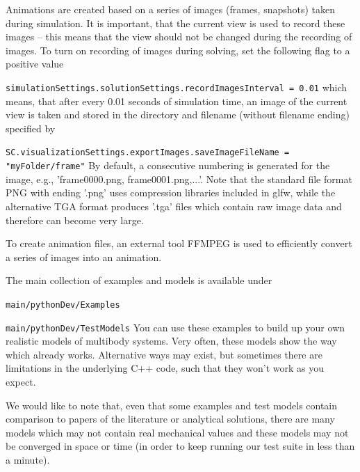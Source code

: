 Animations are created based on a series of images (frames, snapshots) taken during simulation. It is important, that the current view is used to record these images -- this means that the view should not be changed during the recording of images.
To turn on recording of images during solving, set the following flag to a positive value
\bi
  \item \texttt{simulationSettings.solutionSettings.recordImagesInterval = 0.01}
\ei
which means, that after every 0.01 seconds of simulation time, an image of the current view is taken and stored in the directory and filename (without filename ending) specified by 
\bi
  \item \texttt{SC.visualizationSettings.exportImages.saveImageFileName = "myFolder/frame"}
\ei
By default, a consecutive numbering is generated for the image, e.g., 'frame0000.png, frame0001.png,...'. Note that the standard file format PNG with ending '.png' uses compression libraries included in glfw, while the alternative TGA format produces '.tga' files which contain raw image data and therefore can become very large.

To create animation files, an external tool FFMPEG is used to efficiently convert a series of images into an animation.


The main collection of examples and models is available under
\bi
  \item \texttt{main/pythonDev/Examples}
  \item \texttt{main/pythonDev/TestModels}
\ei
You can use these examples to build up your own realistic models of multibody systems.
Very often, these models show the way which already works. Alternative ways may exist, but
sometimes there are limitations in the underlying C++ code, such that they won't work as you expect.

We would like to note that, even that some examples and test models contain comparison to 
papers of the literature or analytical solutions, there are many models which may not contain real
mechanical values and these models may not be converged in space or time 
(in order to keep running our test suite in less than a minute).


